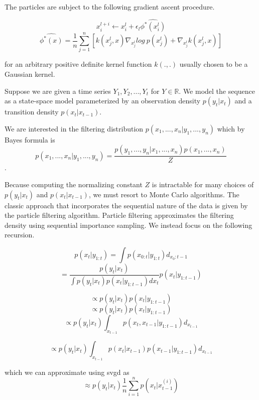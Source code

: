 \documentclass[	DIV=calc,%
							paper=letter,%
							fontsize=12pt%
                            ]{scrartcl}	 					%
\begin{document}
  The particles are subject to the following gradient ascent procedure.

$$x_i^{l+i} \leftarrow x_i^{l}+\epsilon_l\hat{\phi^*(x_i^l)}   $$
$$\hat{\phi^*(x)} = \frac{1}{n}\sum_{j=1}^n[k(x_j^l,x)\nabla_{x_j^l}log\ p(x_j^l) + \nabla_{x_j^l}k(x_j^l,x)]$$

for an arbitrary positive definite kernel function $k(.,.)$ usually chosen to be a Gaussian kernel.


Suppose we are given a time series $Y_1,Y_2,...,Y_t$ for $Y \in \mathbb{R}$. We model the sequence as a state-space model parameterized by an observation density $p(y_t | x_t)$ and a transition density $p(x_t | x_{t-1})$.


We are interested in the filtering distribution $p(x_1,...,x_n | y_1,...,y_n)$ which by Bayes formula is $$p(x_1,...,x_n | y_1,...,y_n) = \frac{p(y_1,...,y_n | x_1,...,x_n) p(x_1,...,x_n)}{Z}$$.

Because computing the normalizing constant $Z$ is intractable for many choices of $p(y_t | x_t)$ and $p(x_t | x_{t-1})$, we must resort to Monte Carlo algorithms. The classic approach that incorporates the sequential nature of the data is given by the particle filtering algorithm. Particle filtering approximates the filtering density using sequential importance sampling. We instead focus on the following recursion.

$$p(x_t | y_{1:t}) = \int p(x_{0:t} | y_{1:t})d_{x_0:t-1}$$
$$=\frac{p(y_t | x_t)}{\int p(y_t|x_t)p(x_t | y_{1:t-1})dx_t}p(x_t | y_{1:t-1})$$

$$\propto p(y_t|x_t)p(x_t | y_{1:t-1})$$
$$\propto p(y_t|x_t)p(x_t | y_{1:t-1})$$
$$\propto p(y_t|x_t)\int_{x_{t-1}}p(x_t,x_{t-1} | y_{1:t-1})d_{x_{t-1}}$$

$$\propto p(y_t|x_t)\int_{x_{t-1}}p(x_t |x_{t-1} )p(x_{t-1}| y_{1:t-1})d_{x_{t-1}}$$

which we can approximate using svgd as
$$\approx p(y_t|x_t) \frac{1}{n}\sum_{i=1}^n p(x_t | x_{t-1}^{(i)})$$





\end{document}
